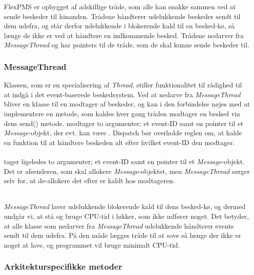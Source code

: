 FlexPMS er opbygget af adskillige tråde, som alle kan snakke sammen ved at sende beskeder til hinanden. Trådene håndterer udelukkende beskeder sendt til dem udefra, og står derfor udelukkende i blokerende kald til en besked-kø, så længe de ikke er ved at håndtere en indkommende besked. Trådene nedarver fra \textit{MessageThread} og har pointers til de tråde, som de skal kunne sende beskeder til.



\subsubsection{MessageThread}
Klassen, som er en specialisering af \textit{Thread}, stiller funktionalitet til rådighed til at indgå i det event-baserede beskedsystem. Ved at nedarve fra \textit{MessageThread} bliver en klasse til en modtager af beskeder, og kan i den forbindelse nøjes med at implementere en  metode, som kaldes hver gang tråden modtager en besked via dens send() metode.  modtager to argumenter; et event-ID samt en pointer til et \textit{Message}-objekt, der evt. kan være . Dispatch bør overholde reglen om, at kalde en funktion til at håndtere beskeden alt efter hvilket event-ID den modtager.\\\\

 tager ligeledes to argumenter; et event-ID samt en pointer til et \textit{Message}-objekt. Det er afsenderen, som skal allokere \textit{Message}-objektet, men \textit{MessageThread} sørger selv for, at de-allokere det efter  er kaldt hos modtageren.\\\\


\textit{MessageThread} laver udelukkende blokerende kald til dens besked-kø, og dermed undgår vi, at stå og bruge CPU-tid i løkker, som ikke udfører noget. Det betyder, at alle klasse som nedarver fra \textit{MessageThread} udelukkende håndterer events sendt til dem udefra. På den måde lægges tråde til at sove så længe der ikke er noget at lave, og programmet vil bruge minimalt CPU-tid.



\subsubsection{Arkitekturspecifikke metoder}

